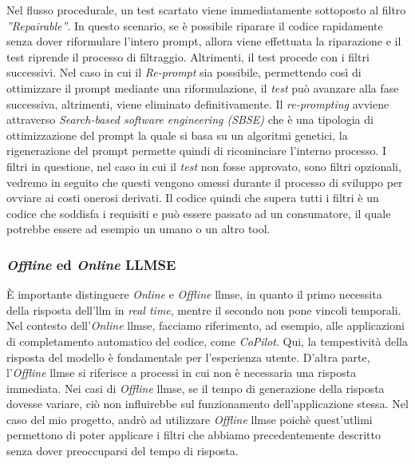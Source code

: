     Nel flusso procedurale, un test scartato viene immediatamente sottoposto al filtro \textit{''Repairable''}. In questo scenario, se è possibile riparare il codice rapidamente senza dover riformulare l'intero prompt, allora viene effettuata la riparazione e il test riprende il processo di filtraggio. Altrimenti, il test procede con i filtri successivi.
    Nel caso in cui il \textit{Re-prompt} sia possibile, permettendo così di ottimizzare il prompt mediante una riformulazione, il \textit{test} può avanzare alla fase successiva, altrimenti, viene eliminato definitivamente.
    Il \textit{re-prompting} avviene attraverso \textit{Search-based software engineering (SBSE)} che è una tipologia di ottimizzazione del prompt la quale si basa su un algoritmi genetici, la rigenerazione del prompt permette quindi di ricominciare l'interno processo.
    I filtri in questione, nel caso in cui il \textit{test} non fosse approvato, sono filtri opzionali, vedremo in seguito che questi vengono omessi durante il processo di sviluppo per ovviare ai costi onerosi derivati.
    Il codice quindi che supera tutti i filtri è un codice che soddisfa i requisiti e può essere passato ad un consumatore, il quale potrebbe essere ad esempio un umano o un altro tool.\newline
    \subsubsection{\textit{Offline} ed \textit{Online} LLMSE}
        È importante distinguere \textit{Online} e \textit{Offline} \gls{llmse}, in quanto il primo necessita della risposta dell'\gls{llm} in \textit{real time}, mentre il secondo non pone vincoli temporali.
        Nel contesto dell'\textit{Online} \gls{llmse}, facciamo riferimento, ad esempio, alle applicazioni di completamento automatico del codice, come \textit{CoPilot}. Qui, la tempestività della risposta del modello è fondamentale per l'esperienza utente.
        D'altra parte, l'\textit{Offline} \gls{llmse} si riferisce a processi in cui non è necessaria una risposta immediata. Nei casi di \textit{Offline} \gls{llmse}, se il tempo di generazione della risposta dovesse variare, ciò non influirebbe sul funzionamento dell'applicazione stessa. Nel caso del mio progetto, andrò ad utilizzare \textit{Offline} \gls{llmse} poichè quest'utlimi permettono
        di poter applicare i filtri che abbiamo precedentemente descritto senza dover preoccuparsi del tempo di risposta.
